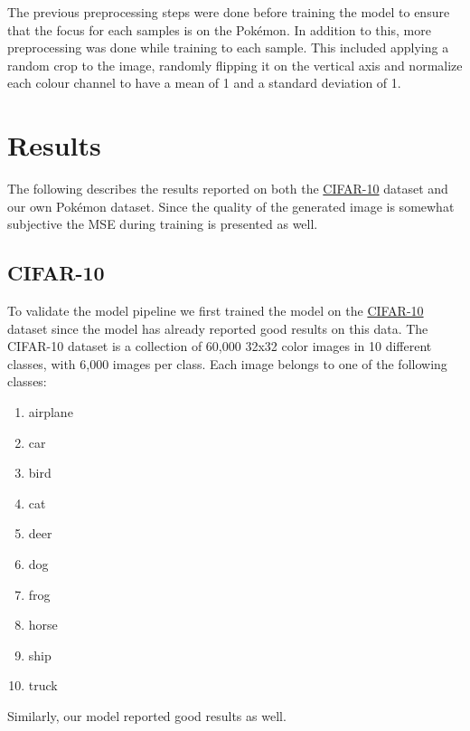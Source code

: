 \documentclass[12pt]{article}
\theoremstyle{plain}
\theoremstyle{definition}
\theoremstyle{remark}
\begin{document}
The previous preprocessing steps were done before training the model to ensure that the focus for each samples is on the Pokémon. In addition to this, more preprocessing was done while training to each sample. This included applying a random crop to the image, randomly flipping it on the vertical axis and normalize each colour channel to have a mean of 1 and a standard deviation of 1.

\newpage

\section{Results}\label{sec:results}
The following describes the results reported on both the \href{https://www.cs.toronto.edu/~kriz/cifar.html}{\ac{CIFAR-10}} dataset and our own Pokémon dataset. Since the quality of the generated image is somewhat subjective the \ac{MSE} during training is presented as well. 


\subsection{\ac{CIFAR-10}}\label{sec:results:cifar10}
To validate the model pipeline we first trained the model on the \href{https://www.cs.toronto.edu/~kriz/cifar.html}{\ac{CIFAR-10}} dataset since the model has already reported good results on this data. The \ac{CIFAR-10} dataset is a collection of 60,000 32x32 color images in 10 different classes, with 6,000 images per class. Each image belongs to one of the following classes:

\begin{multicols}{5}
	\begin{enumerate}[itemsep=2pt,parsep=2pt]
		\item airplane
		\item car
		\item bird
		\item cat
		\item deer
		\item dog
		\item frog 
		\item horse
		\item ship
		\item truck
	\end{enumerate}
\end{multicols}

Similarly, our model reported good results as well. 
\end{document}
